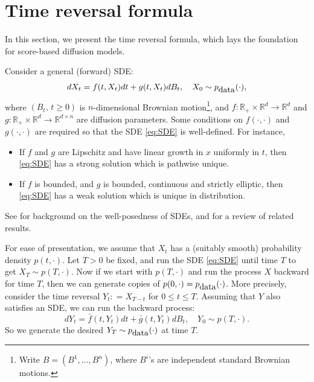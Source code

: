 \documentclass[letterpaper,11pt,reqno]{amsart}
\numberwithin{equation}{section}
\begin{document}
\section{Time reversal formula}
\label{sc2}

\quad In this section, 
we present the time reversal formula,
which lays the foundation for score-based diffusion models.

\quad Consider a general (forward) SDE:
\begin{equation}
\label{eq:SDE}
dX_t = f(t, X_t) dt + g(t,X_t) dB_t, \quad X_0 \sim p_{\tiny \mbox{data}}(\cdot),
\end{equation}
where $(B_t, \, t \ge 0)$ is $n$-dimensional Brownian motion\footnote{Write $B = (B^1, \ldots, B^n)$,
where $B^i$'s are independent standard Brownian motions.}, 
and $f: \mathbb{R}_+ \times \mathbb{R}^d \to \mathbb{R}^d$ 
and $g: \mathbb{R}_+ \times \mathbb{R}^d \to \mathbb{R}^{d \times n}$
are diffusion parameters.
Some conditions on $f(\cdot, \cdot)$ and $g(\cdot, \cdot)$ are required
so that the SDE \eqref{eq:SDE} is well-defined.
For instance,
\begin{itemize}[itemsep = 3 pt]
\item
If $f$ and $g$ are Lipschitz and have linear growth in $x$ uniformly in $t$, then \eqref{eq:SDE} has a strong solution which is pathwise unique.
\item
If $f$ is bounded, and $g$ is bounded, continuous and strictly elliptic, then \eqref{eq:SDE} has a weak solution which is unique in distribution.
\end{itemize}
See \cite{KS91, Os98} for background on the well-posedness of SDEs, 
and \cite[Chapter 1]{CE05} for a review of related results.

\quad For ease of presentation,
we assume that $X_t$ has a (suitably smooth) 
probability density $p(t, \cdot)$.
Let $T > 0$ be fixed, and run the SDE \eqref{eq:SDE} until time $T$ to get $X_T \sim p(T, \cdot)$.
Now if we start with $p(T, \cdot)$ and run the process $X$ backward for time $T$,
then we can generate copies of $p(0, \cdot) = p_{\tiny \mbox{data}}(\cdot)$.
More precisely, consider the time reversal $Y_t: = X_{T-t}$ for $0 \le t \le T$.
Assuming that $Y$ also satisfies an SDE, 
we can run the backward process:
\begin{equation*}
dY_t = \bar{f}(t, Y_t) dt + \bar{g}(t, Y_t ) dB_t, \quad Y_0 \sim p(T, \cdot).
\end{equation*}
So we generate the desired $Y_T  \sim p_{\tiny \mbox{data}}(\cdot)$ at time $T$.
\end{document}
